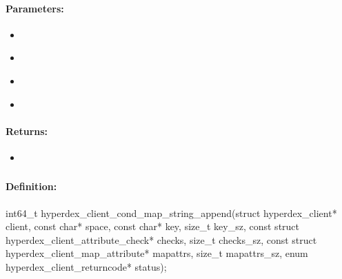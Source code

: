 \paragraph{Parameters:}
\begin{itemize}[noitemsep]
\item {}\\

\item {}\\

\item {}\\

\item {}\\

\end{itemize}

\paragraph{Returns:}
\begin{itemize}[noitemsep]
\item {}\\

\end{itemize}

\pagebreak
\subsubsection{}
\label{api:c:cond_map_string_append}


\paragraph{Definition:}
\begin{ccode}
int64_t hyperdex_client_cond_map_string_append(struct hyperdex_client* client,
        const char* space,
        const char* key, size_t key_sz,
        const struct hyperdex_client_attribute_check* checks, size_t checks_sz,
        const struct hyperdex_client_map_attribute* mapattrs, size_t mapattrs_sz,
        enum hyperdex_client_returncode* status);
\end{ccode}


